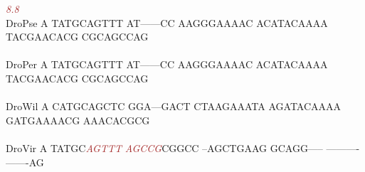 \documentclass[11pt,twoside,reqno,a4paper]{article}
\begin{document}
{\hspace*{7\charwidth}\hspace*{1\charwidth}\hspace*{6\charwidth}\textit{\textcolor{Brown}{8.8}}\hspace*{1\charwidth}\hspace*{1\charwidth}\hspace*{1\charwidth}\hspace*{1\charwidth}\hspace*{1\charwidth}\\
DroPse	A	TATGCAGTTT	AT------CC	AAGGGAAAAC	ACATACAAAA	TACGAACACG	CGCAGCCAG\\
\hspace*{7\charwidth}\hspace*{1\charwidth}\hspace*{1\charwidth}\hspace*{1\charwidth}\hspace*{1\charwidth}\hspace*{1\charwidth}\hspace*{1\charwidth}\\
DroPer	A	TATGCAGTTT	AT------CC	AAGGGAAAAC	ACATACAAAA	TACGAACACG	CGCAGCCAG\\
\hspace*{7\charwidth}\hspace*{1\charwidth}\hspace*{1\charwidth}\hspace*{1\charwidth}\hspace*{1\charwidth}\hspace*{1\charwidth}\hspace*{1\charwidth}\\
DroWil	A	CATGCAGCTC	GGA---GACT	CTAAGAAATA	AGATACAAAA	GATGAAAACG	AAACACGCG\\
\hspace*{7\charwidth}\hspace*{1\charwidth}\hspace*{1\charwidth}\hspace*{1\charwidth}\hspace*{1\charwidth}\hspace*{1\charwidth}\hspace*{1\charwidth}\\
DroVir	A	TATGC\textit{\textcolor{Brown}{A}}\textit{\textcolor{Brown}{G}}\textit{\textcolor{Brown}{T}}\textit{\textcolor{Brown}{T}}\textit{\textcolor{Brown}{T}}	\textit{\textcolor{Brown}{A}}\textit{\textcolor{Brown}{G}}\textit{\textcolor{Brown}{C}}\textit{\textcolor{Brown}{C}}\textit{\textcolor{Brown}{G}}CGGCC	--AGCTGAAG	GCAGG-----	----------	-------AG\\
}
\end{document}
